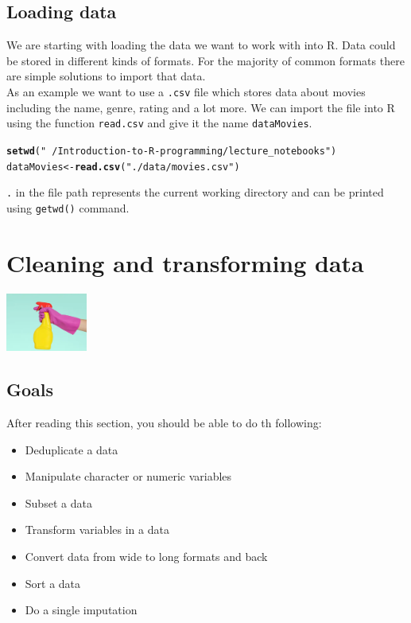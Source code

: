 \documentclass[a4paper]{article}\usepackage[]{graphicx}\usepackage[]{xcolor}
\makeatletter
\newcommand{\hlstr}[1]{\textcolor[rgb]{0.192,0.494,0.8}{#1}}%
\newcommand{\hlstd}[1]{\textcolor[rgb]{0.345,0.345,0.345}{#1}}%
\newcommand{\hlkwb}[1]{\textcolor[rgb]{0.69,0.353,0.396}{#1}}%
\newcommand{\hlkwd}[1]{\textcolor[rgb]{0.737,0.353,0.396}{\textbf{#1}}}%
\newenvironment{kframe}{%
 \def\at@end@of@kframe{}%
 \ifinner\ifhmode%
  \def\at@end@of@kframe{\end{minipage}}%
  \begin{minipage}{\columnwidth}%
 \fi\fi%
 \def\FrameCommand##1{\hskip\@totalleftmargin \hskip-\fboxsep
 \colorbox{shadecolor}{##1}\hskip-\fboxsep
     \hskip-\linewidth \hskip-\@totalleftmargin \hskip\columnwidth}%
 \MakeFramed {\advance\hsize-\width
   \@totalleftmargin\z@ \linewidth\hsize
   \@setminipage}}%
 {\par\unskip\endMakeFramed%
 \at@end@of@kframe}
\newenvironment{knitrout}{}{} %
\makeatother
\begin{document}
\subsection{Loading data}
\noindent We are starting with loading the data we want to work with into R. Data could be stored in different kinds of formats. For the majority of common formats there are simple solutions to import that data.\\
As an example we want to use a \texttt{.csv} file which stores data about movies including the name, genre, rating and a lot more. We can import the file into R using the function \texttt{read.csv} and give it the name  \texttt{dataMovies}.

\begin{knitrout}
\color{fgcolor}\begin{kframe}
\begin{alltt}
\hlkwd{setwd}\hlstd{(}\hlstr{"~/Introduction-to-R-programming/lecture_notebooks"}\hlstd{)}
\hlstd{dataMovies} \hlkwb{<-} \hlkwd{read.csv}\hlstd{(}\hlstr{"./data/movies.csv"}\hlstd{)}
\end{alltt}
\end{kframe}
\end{knitrout}
\noindent \texttt{.} in the file path represents the current working directory and  can be printed using \texttt{getwd()} command.





\section{Cleaning and transforming data}

\begin{center}
 \includegraphics[width = 0.2\textwidth]{./image/cleaning_data.png}    
\end{center} 

\subsection*{Goals}
After reading this section, you should be able to do th following:
\begin{itemize}
\item Deduplicate a data
\item Manipulate character or numeric variables 
\item Subset a data
\item Transform variables in a data
\item Convert data from wide to long formats and back
\item Sort a data
\item Do a single imputation
\end{itemize} 
\end{document}
